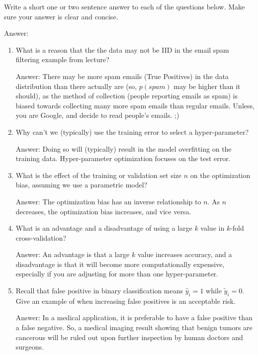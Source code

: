 \documentclass{article}
\newcommand{\blu}[1]{{\textcolor{blu}{#1}}}
\newenvironment{answer}{\par\begingroup\color{gre}Answer: }{\endgroup}
\let\ask\blu
\begin{document}
    \ask{Write a short one or two sentence answer to each of the questions below}. Make sure your answer is clear and concise.
    \begin{answer}

    \end{answer}
    \begin{enumerate}
        \item What is a reason that the the data may not be IID in the email spam filtering example from lecture?
        \begin{answer}
        There may be more spam emails (True Positives) in the data distribution than there actually are (so, $p(spam)$ may be higher than it should), as the method of collection (people reporting emails as spam) is biased towards collecting many more spam emails than regular emails. Unless, you are Google, and decide to read people's emails. ;)
        \end{answer}
        \item Why can't we (typically) use the training error to select a hyper-parameter?
        \begin{answer}
        Doing so will (typically) result in the model overfitting on the training data. Hyper-parameter optimization focuses on the test error.
        \end{answer}
        \item What is the effect of the training or validation set size $n$ on the optimization bias, assuming we use a parametric model?
        \begin{answer}
        The optimization bias has an inverse relationship to $n$. As $n$ decreases, the optimization bias increases, and vice versa.
        \end{answer}
        \item What is an advantage and a disadvantage of using a large $k$ value in $k$-fold cross-validation?
        \begin{answer}
        An advantage is that a large $k$ value increases accuracy, and a disadvantage is that it will become more computationally expensive, especially if you are adjusting for more than one hyper-parameter.
        \end{answer}
        \item Recall that false positive in binary classification means $\hat y_i=1$ while $\tilde y_i = 0$. Give an example of when increasing false positives is an acceptable risk.
        \begin{answer}
        In a medical application, it is preferable to have a false positive than a false negative. So, a medical imaging result showing that benign tumors are cancerous will be ruled out upon further inspection by human doctors and surgeons.

\end{answer}
\end{enumerate}
\end{document}

